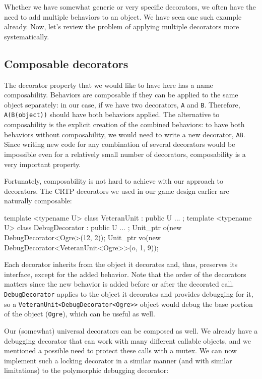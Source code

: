 Whether we have somewhat generic or very specific decorators, we often have the need to add multiple behaviors to an object. We have seen one such example already. Now, let's review the problem of applying multiple decorators more systematically.

\subsection{Composable decorators}

The decorator property that we would like to have here has a name composability. Behaviors are composable if they can be applied to the same object separately: in our case, if we have two decorators, \texttt{A} and \texttt{B}. Therefore, \texttt{A(B(object))} should have both behaviors applied. The alternative to composability is the explicit creation of the combined behaviors: to have both behaviors without composability, we would need to write a new decorator, \texttt{AB}. Since writing new code for any combination of several decorators would be impossible even for a relatively small number of decorators, composability is a very important property.

Fortunately, composability is not hard to achieve with our approach to decorators. The CRTP decorators we used in our game design earlier are naturally composable:

\begin{code}
template <typename U> class VeteranUnit : public U { ... };
template <typename U> class DebugDecorator : public U { ...
};
Unit_ptr o(new DebugDecorator<Ogre>(12, 2));
Unit_ptr vo(new DebugDecorator<VeteranUnit<Ogre>>(o, 1, 9));
\end{code}

Each decorator inherits from the object it decorates and, thus, preserves its interface, except for the added behavior. Note that the order of the decorators matters since the new behavior is added before or after the decorated call. \texttt{DebugDecorator} applies to the object it decorates and provides debugging for it, so a \texttt{VeteranUnit\textless{}DebugDecorator\textless{}Ogre\textgreater{}\textgreater{}} object would debug the base portion of the object (\texttt{Ogre}), which can be useful as well.

Our (somewhat) universal decorators can be composed as well. We already have a debugging decorator that can work with many different callable objects, and we mentioned a possible need to protect these calls with a mutex. We can now implement such a locking decorator in a similar manner (and with similar limitations) to the polymorphic debugging decorator:

